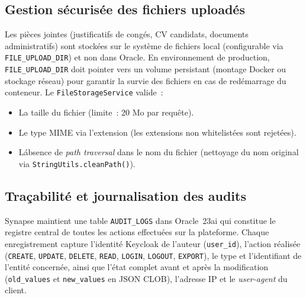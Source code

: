 \subsection{Gestion sécurisée des fichiers uploadés}

Les pièces jointes (justificatifs de congés, CV candidats, documents administratifs)
sont stockées sur le système de fichiers local (configurable via \texttt{FILE\_UPLOAD\_DIR})
et non dans Oracle. En environnement de production, \texttt{FILE\_UPLOAD\_DIR} doit
pointer vers un volume persistant (montage Docker ou stockage réseau) pour garantir
la survie des fichiers en cas de redémarrage du conteneur. Le \texttt{FileStorageService} valide~:
\begin{itemize}[leftmargin=*,nosep]
  \item La taille du fichier (limite~: 20 Mo par requête).
  \item Le type MIME via l'extension (les extensions non whitelistées sont rejetées).
  \item Lábsence de \textit{path traversal} dans le nom du fichier (nettoyage du
        nom original via \texttt{StringUtils.cleanPath()}).
\end{itemize}

\subsection{Traçabilité et journalisation des audits}

Synapse maintient une table \texttt{AUDIT\_LOGS} dans Oracle~23ai qui constitue
le registre central de toutes les actions effectuées sur la plateforme.
Chaque enregistrement capture l'identité Keycloak de l'auteur (\texttt{user\_id}),
l'action réalisée (\texttt{CREATE}, \texttt{UPDATE}, \texttt{DELETE}, \texttt{READ},
\texttt{LOGIN}, \texttt{LOGOUT}, \texttt{EXPORT}), le type et l'identifiant de
l'entité concernée, ainsi que l'état complet avant et après la modification
(\texttt{old\_values} et \texttt{new\_values} en JSON CLOB), l'adresse IP et le
\textit{user-agent} du client.

